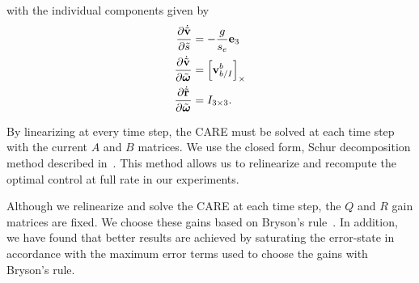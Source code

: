 with the individual components given by
\begin{align}
  \frac{\partial\dot{\tilde{\boldsymbol{\mathrm{v}}}}}{\partial\tilde{s}} & =-\frac{g}{s_e}\boldsymbol{\mathrm{e}}_{3}\\
  \frac{\partial\dot{\tilde{\boldsymbol{\mathrm{v}}}}}{\partial\tilde{\boldsymbol{\mathrm{\omega}}}} &
  =\left[ {\bf v}_{b/I}^{b} \right]_{\times} \\
  \frac{\partial\dot{\tilde{\boldsymbol{\mathrm{r}}}}}{\partial\tilde{\boldsymbol{\mathrm{\omega}}}} & =I_{3\times3}.
\end{align}

By linearizing at every time step, the CARE
must be solved at each time step with the current $A$ and $B$ matrices. We use the
closed form, Schur decomposition method described in~\cite{laub1979schur}. This
method allows us to relinearize and recompute the optimal control at full rate
in our experiments.

Although we relinearize and solve the CARE at each time step, the $Q$ and $R$
gain matrices are fixed. We choose these gains based on Bryson's
rule~\cite{hespanha2018linear}. In addition, we have found that better results
are achieved by saturating the error-state in accordance with the maximum error
terms used to choose the gains with Bryson's rule.
